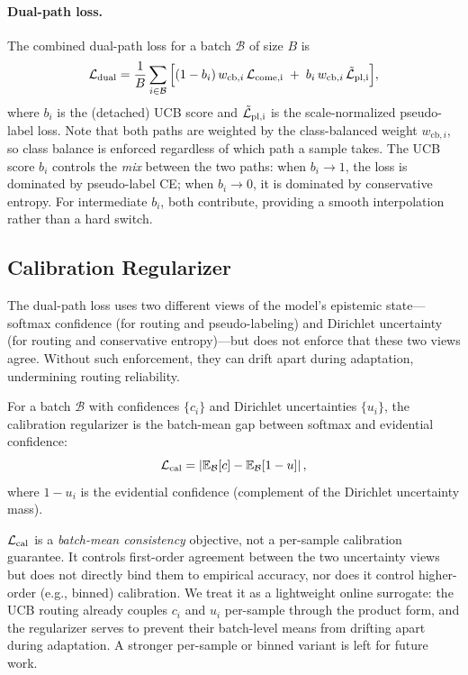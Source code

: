 \paragraph{Dual-path loss.}
The combined dual-path loss for a batch $\mathcal{B}$ of size $B$ is
\begin{equation}
  \mathcal{L}_\mathrm{dual} = \frac{1}{B} \sum_{i \in \mathcal{B}} \Big[ (1 - b_i)\, w_{\mathrm{cb},i}\, \mathcal{L}_\mathrm{come,i} \;+\; b_i\, w_{\mathrm{cb},i}\, \tilde{\mathcal{L}}_\mathrm{pl,i} \Big],
  \label{eq:dual-loss}
\end{equation}
where $b_i$ is the (detached) UCB score and $\tilde{\mathcal{L}}_\mathrm{pl,i}$ is the scale-normalized pseudo-label loss. Note that both paths are weighted by the class-balanced weight $w_{\mathrm{cb},i}$, so class balance is enforced regardless of which path a sample takes. The UCB score $b_i$ controls the \emph{mix} between the two paths: when $b_i \to 1$, the loss is dominated by pseudo-label CE; when $b_i \to 0$, it is dominated by conservative entropy. For intermediate $b_i$, both contribute, providing a smooth interpolation rather than a hard switch.

\subsection{Calibration Regularizer}
\label{sec:method:cal}

The dual-path loss uses two different views of the model's epistemic state---softmax confidence (for routing and pseudo-labeling) and Dirichlet uncertainty (for routing and conservative entropy)---but does not enforce that these two views agree. Without such enforcement, they can drift apart during adaptation, undermining routing reliability.

\begin{definition}
\label{def:cal}
For a batch $\mathcal{B}$ with confidences $\{c_i\}$ and Dirichlet uncertainties $\{u_i\}$, the calibration regularizer is the batch-mean gap between softmax and evidential confidence:
\begin{equation}
  \mathcal{L}_\mathrm{cal} = \left| \mathbb{E}_\mathcal{B}[c] - \mathbb{E}_\mathcal{B}[1-u] \right|,
  \label{eq:cal-loss}
\end{equation}
where $1 - u_i$ is the evidential confidence (complement of the Dirichlet uncertainty mass).
\end{definition}

\begin{remark}
\label{rem:cal-scope}
$\mathcal{L}_\mathrm{cal}$ is a \emph{batch-mean consistency} objective, not a per-sample calibration guarantee. It controls first-order agreement between the two uncertainty views but does not directly bind them to empirical accuracy, nor does it control higher-order (e.g., binned) calibration. We treat it as a lightweight online surrogate: the UCB routing already couples $c_i$ and $u_i$ per-sample through the product form, and the regularizer serves to prevent their batch-level means from drifting apart during adaptation. A stronger per-sample or binned variant is left for future work.
\end{remark}

